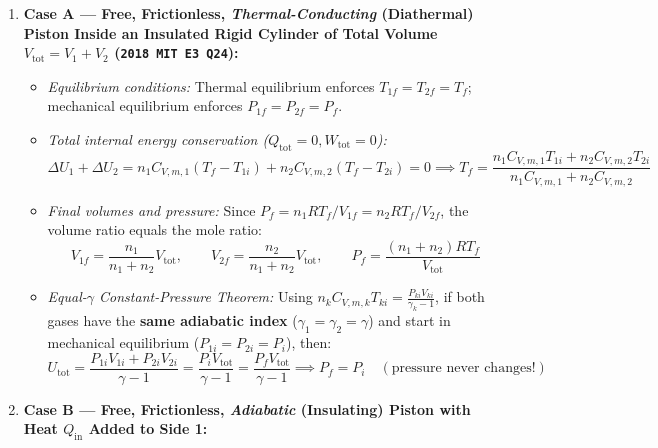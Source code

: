 \begin{formulacard}
\begin{enumerate}
  \item \textbf{Case A — Free, Frictionless, \emph{Thermal-Conducting} (Diathermal) Piston Inside an Insulated Rigid Cylinder of Total Volume $V_{\mathrm{tot}} = V_1 + V_2$ (\texttt{2018 MIT E3 Q24}):}
  \begin{itemize}
    \item \emph{Equilibrium conditions:} Thermal equilibrium enforces $T_{1f} = T_{2f} = T_f$; mechanical equilibrium enforces $P_{1f} = P_{2f} = P_f$.
    \item \emph{Total internal energy conservation ($Q_{\mathrm{tot}}=0, W_{\mathrm{tot}}=0$):}
    \begin{equation}\label{eq:06:piston-diathermal-T}
      \Delta U_1 + \Delta U_2 = n_1 C_{V,m,1}(T_f - T_{1i}) + n_2 C_{V,m,2}(T_f - T_{2i}) = 0 \implies \boxed{T_f = \frac{n_1 C_{V,m,1} T_{1i} + n_2 C_{V,m,2} T_{2i}}{n_1 C_{V,m,1} + n_2 C_{V,m,2}}}
    \end{equation}
    \item \emph{Final volumes and pressure:} Since $P_f = n_1 R T_f / V_{1f} = n_2 R T_f / V_{2f}$, the volume ratio equals the mole ratio:
    \begin{equation}\label{eq:06:piston-diathermal-V}
      \boxed{V_{1f} = \frac{n_1}{n_1 + n_2}V_{\mathrm{tot}}, \qquad V_{2f} = \frac{n_2}{n_1 + n_2}V_{\mathrm{tot}}, \qquad P_f = \frac{(n_1 + n_2)R T_f}{V_{\mathrm{tot}}}}
    \end{equation}
    \item \emph{Equal-$\gamma$ Constant-Pressure Theorem:} Using $n_k C_{V,m,k} T_{ki} = \frac{P_{ki}V_{ki}}{\gamma_k - 1}$, if both gases have the \textbf{same adiabatic index} ($\gamma_1 = \gamma_2 = \gamma$) and start in mechanical equilibrium ($P_{1i} = P_{2i} = P_i$), then:
    \begin{equation}\label{eq:06:piston-const-P}
      U_{\mathrm{tot}} = \frac{P_{1i}V_{1i} + P_{2i}V_{2i}}{\gamma - 1} = \frac{P_i V_{\mathrm{tot}}}{\gamma - 1} = \frac{P_f V_{\mathrm{tot}}}{\gamma - 1} \implies \boxed{P_f = P_i \quad (\text{pressure never changes!})}
    \end{equation}
  \end{itemize}
  \item \textbf{Case B — Free, Frictionless, \emph{Adiabatic} (Insulating) Piston with Heat $Q_{\mathrm{in}}$ Added to Side 1:}

\end{enumerate}
\end{formulacard}

